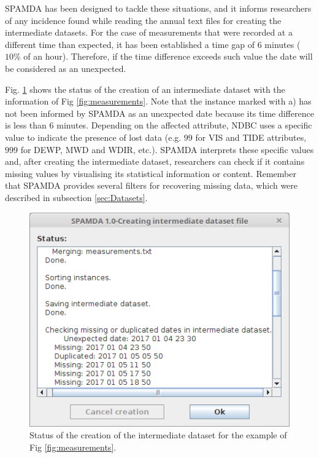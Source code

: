 \documentclass[energies,article,submit,moreauthors,pdftex]{Definitions/mdpi}
\begin{document}
		SPAMDA has been designed to tackle these situations, and it informs researchers of any incidence found while reading the annual text files for creating the intermediate datasets. For the case of measurements that were recorded at a different time than expected, it has been established a time gap of 6 minutes ($10\%$ of an hour). Therefore, if the time difference exceeds such value the date will be considered as an unexpected.
		
		Fig. \ref{fig:creatingDataset} shows the status of the creation of an intermediate dataset with the information of Fig \ref{fig:measurements}. Note that the instance marked with a) has not been informed by SPAMDA as an unexpected date because its time difference is less than $6$ minutes. Depending on the affected attribute, NDBC uses a specific value \cite{NOAA_3} to indicate the presence of lost data (e.g. $99$ for VIS and TIDE attributes, $999$ for DEWP, MWD and WDIR, etc.). SPAMDA interprets these specific values and, after creating the intermediate dataset, researchers can check if it contains missing values by visualising its statistical information or content. Remember that SPAMDA provides several filters for recovering missing data, which were described in subsection \ref{sec:Datasets}.
		
		\begin{figure}[ht!]
			\centering
			\includegraphics[scale=0.47]{figures/FigureCreatingDataset.png}
			\caption{Status of the creation of the intermediate dataset for the example of Fig \ref{fig:measurements}.}
			\label{fig:creatingDataset}
		\end{figure}
		
\end{document}
